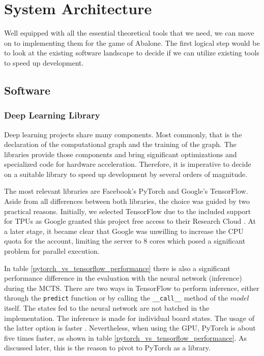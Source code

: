 \chapter{System Architecture}
\label{system-architecture}
Well equipped with all the essential theoretical tools that we need, we can move on to implementing them for the game of Abalone. The first logical step would be to look at the existing software landscape to decide if we can utilize existing tools to speed up development.

\section{Software}
\subsection{Deep Learning Library}
Deep learning projects share many components. Most commonly, that is the declaration of the computational graph and the training of the graph. The libraries provide those components and bring significant optimizations and specialized code for hardware acceleration. Therefore, it is imperative to decide on a suitable library to speed up development by several orders of magnitude.

The most relevant libraries are Facebook's PyTorch and Google's TensorFlow. Aside from all differences between both libraries, the choice was guided by two practical reasons. Initially, we selected TensorFlow due to the included support for TPUs as Google granted this project free access to their Research Cloud \cite{noauthor_tpu_nodate}. At a later stage, it became clear that Google was unwilling to increase the CPU quota for the account, limiting the server to 8 cores which posed a significant problem for parallel execution.

In table \ref{pytorch_vs_tensorflow_performance} there is also a significant performance difference in the evaluation with the neural network (inference) during the MCTS. There are two ways in TensorFlow to perform inference, either through the \texttt{predict} function or by calling the \texttt{\_\_call\_\_} method of the $model$ itself. The states fed to the neural network are not batched in the implementation. The inference is made for individual board states. The usage of the latter option is faster \cite{noauthor_tfkerasmodel_nodate}. Nevertheless, when using the GPU, PyTorch is about five times faster, as shown in table \ref{pytorch_vs_tensorflow_performance}. As discussed later, this is the reason to pivot to PyTorch as a library.

